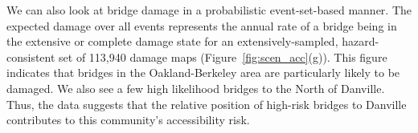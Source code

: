 We can also look at bridge damage in a probabilistic event-set-based manner. The expected damage over all events represents the annual rate of a bridge being in the extensive or complete damage state for an extensively-sampled, hazard-consistent set of 113,940 damage maps (Figure~\ref{fig:scen_acc}{(g)}). This figure indicates that bridges in the Oakland-Berkeley area are particularly likely to be damaged. We also see a few high likelihood bridges to the North of Danville. Thus, the data suggests that the relative position of high-risk bridges to Danville contributes to this community's accessibility risk.



